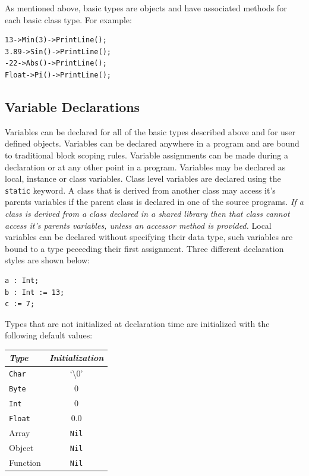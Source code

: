 \documentclass[12pt]{article}
\begin{document}
As mentioned above, basic types are objects and have associated
methods for each basic class type.  For example:

\begin{verbatim}
13->Min(3)->PrintLine();
3.89->Sin()->PrintLine();
-22->Abs()->PrintLine();
Float->Pi()->PrintLine();
\end{verbatim}

\subsection{Variable Declarations}
Variables can be declared for all of the basic types described above
and for user defined objects. Variables can be declared anywhere in a
program and are bound to traditional block scoping rules.  Variable
assignments can be made during a declaration or at any other point in
a program. Variables may be declared as local, instance or class
variables.  Class level variables are declared using the
\texttt{static} keyword. A class that is derived from another class
may access it's parents variables if the parent class is declared in
one of the source programs.  \textit{If a class is derived from a
  class declared in a shared library then that class cannot access
  it's parents variables, unless an accessor method is provided.}
Local variables can be declared without specifying their data type,
such variables are bound to a type peceeding their first
assignment. Three different declaration styles are shown below:

\begin{verbatim}
a : Int;
b : Int := 13;
c := 7;
\end{verbatim}

Types that are not initialized at declaration time are initialized
with the following default values:

\vspace{\baselineskip}
\begin{center}
  \begin{tabular}{| l | c |}
    \hline
    \emph{Type} & \emph{Initialization} \\ \hline \hline
    \texttt{Char} & `\textbackslash0' \\ \hline
    \texttt{Byte} & 0 \\ \hline
    \texttt{Int} & 0 \\ \hline
    \texttt{Float} & 0.0 \\ \hline
    Array & \texttt{Nil} \\ \hline
    Object & \texttt{Nil} \\ \hline
    Function & \texttt{Nil} \\ \hline
  \end{tabular}
\end{center}
\end{document}
